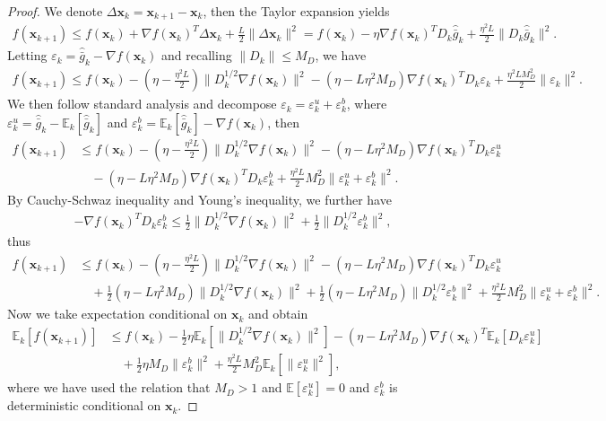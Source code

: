 \documentclass{article}
\newcommand{\bx}{\boldsymbol{x}}
\newcommand{\barg}{\bar{g}}
\theoremstyle{plain}
\theoremstyle{definition}
\theoremstyle{remark}
\begin{document}
\begin{proof}
We denote $\Delta\bx_k = \bx_{k+1}-\bx_k$, then the Taylor expansion yields
\begin{align*}
    f(\bx_{k+1})  \le f(\bx_k) + \nabla f(\bx_k)^T \Delta \bx_k + \frac{L }{2} \|\Delta \bx_k\|^2  = f(\bx_k) - \eta  \nabla f(\bx_k)^T D_k\widehat{\barg}_k + \frac{\eta^2 L }{2} \|D_k\widehat{\barg}_k\|^2.
\end{align*}
Letting $\varepsilon_k = \widehat{\barg}_k - \nabla f(\bx_k)$ and recalling $\|D_k\|\leq M_D$, we have
\begin{align*}
    f(\bx_{k+1}) \le f(\bx_k) - \left(\eta-\frac{\eta^2 L }{2} \right) \| D_k^{1/2}\nabla f(\bx_k)\|^2  - (\eta - L \eta^2 M_D) \nabla f(\bx_k)^T D_k \varepsilon_k  + \frac{\eta^2 L M_D^2}{2}  \|\varepsilon_k\|^2.
\end{align*}
We then follow standard analysis and decompose $\varepsilon_k = \varepsilon_k^u+\varepsilon_k^b$, where $\varepsilon_k^u=\widehat{\barg}_k-\mathbb{E}_k[\widehat{\barg}_k]$ and $\varepsilon_k^b=\mathbb{E}_k[\widehat{\barg}_k]-\nabla f(\bx_k)$, then
\begin{align*}
    f(\bx_{k+1}) & \le f(\bx_k) - \left(\eta-\frac{\eta^2 L }{2} \right) \| D_k^{1/2}\nabla f(\bx_k)\|^2  - (\eta - L \eta^2 M_D) \nabla f(\bx_k)^T D_k \varepsilon_k^u \\
    & \quad - (\eta - L \eta^2 M_D) \nabla f(\bx_k)^T D_k \varepsilon_k^b  + \frac{\eta^2 L }{2} M_D^2 \|\varepsilon_k^u+\varepsilon_k^b\|^2.
\end{align*}
By Cauchy-Schwaz inequality and Young's inequality, we further have
\begin{align*}
   -  \nabla f(\bx_k)^T D_k \varepsilon_k^b \leq \frac{1}{2}\|D_k^{1/2}\nabla f(\bx_k)\|^2 + \frac{1}{2}\|D_k^{1/2} \varepsilon_k^b\|^2, 
\end{align*}
thus
\begin{align*}
    f(\bx_{k+1}) & \le f(\bx_k) - \left(\eta-\frac{\eta^2 L }{2} \right) \| D_k^{1/2}\nabla f(\bx_k)\|^2  - (\eta - L \eta^2 M_D) \nabla f(\bx_k)^T D_k \varepsilon_k^u \\
    & \quad + \frac{1}{2} (\eta - L \eta^2 M_D) \|D_k^{1/2}\nabla f(\bx_k)\|^2 + \frac{1}{2}(\eta - L \eta^2 M_D) \|D_k^{1/2} \varepsilon_k^b\|^2 + \frac{\eta^2 L }{2} M_D^2 \|\varepsilon_k^u+\varepsilon_k^b\|^2.
\end{align*}
Now we take expectation conditional on $\bx_k$ and obtain
\begin{align*}
    \mathbb{E}_k[ f(\bx_{k+1}) ] & \le f(\bx_k) - \frac{1}{2} \eta \mathbb{E}_k[ \| D_k^{1/2}\nabla f(\bx_k)\|^2 ] - (\eta - L \eta^2 M_D) \nabla f(\bx_k)^T \mathbb{E}_k[ D_k \varepsilon_k^u] \\
    & \quad + \frac{1}{2}\eta M_D  \|\varepsilon_k^b\|^2  + \frac{\eta^2 L }{2} M_D^2 \mathbb{E}_k[ \|\varepsilon_k^u\|^2],
\end{align*}
where we have used the relation that $M_D>1$ and $\mathbb{E}[\varepsilon_k^u]=0$ and $\varepsilon_k^b$ is deterministic conditional on $\bx_k$.

\end{proof}
\end{document}
